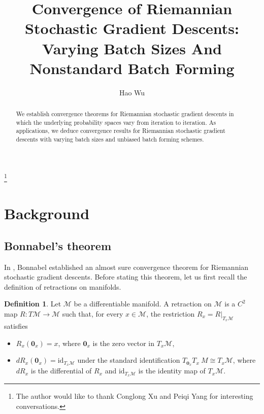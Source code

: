 \documentclass{amsart}
\newcommand{\id}{\mathrm{id}}
\newcommand{\M}{\mathcal{M}}
\theoremstyle{plain}
\theoremstyle{definition}
\newtheorem{definition}[theorem]{Definition}
\theoremstyle{remark}
\numberwithin{theorem}{section}
\numberwithin{equation}{section}
\begin{document}
\title{Convergence of Riemannian Stochastic Gradient Descents: Varying Batch Sizes And Nonstandard Batch Forming}


\author{Hao Wu}

\thanks{The author would like to thank Conglong Xu and Peiqi Yang for interesting conversations.}

\address{Department of Mathematics, The George Washington University, Phillips Hall, Room 739, 801 22nd Street, N.W., Washington DC 20052, USA. Telephone: 1-202-994-0653, Fax: 1-202-994-6760}




\begin{abstract}
We establish convergence theorems for Riemannian stochastic gradient descents in which the underlying probability spaces vary from iteration to iteration. As applications, we deduce  convergence results for Riemannian stochastic gradient descents with varying batch sizes and unbiased batch forming schemes.
\end{abstract}

\maketitle

\section{Background}\label{sec-background}

\subsection{Bonnabel's theorem} In \cite{Bonnabel}, Bonnabel established an almost sure convergence theorem for Riemannian stochastic gradient descents. Before stating this theorem, let us first recall the definition of retractions on manifolds.


\begin{definition}\cite[Definition 4.1.1]{AMS}\label{def-retraction}
Let $\M$ be a differentiable manifold. A retraction on $\M$ is a $C^2$ map $R:T\M \rightarrow \M$ such that, for every $x \in \M$, the restriction $R_x=R|_{T_x \M}$ satisfies
\begin{itemize}
	\item $R_x(\mathbf{0}_x)=x$, where $\mathbf{0}_x$ is the zero vector in $T_x \M$,
	\item $dR_x(\mathbf{0}_x)=\id_{T_x \M}$ under the standard identification $T_{\mathbf{0}_x}T_x\ M \cong T_x \M$, where $dR_x$ is the differential of $R_x$ and $\id_{T_x \M}$ is the identity map of $T_x \M$.
\end{itemize}
\end{definition}
\end{document}
